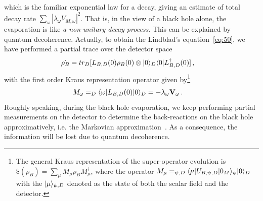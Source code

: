 \documentclass[12pt,a4paper]{article}
\begin{document}
which is the familiar exponential law for a decay, giving an estimate of total decay rate
$\sum_{\omega}|\lambda_{\omega}V_{M,\omega}|^2$. That is,
in the view of a black hole alone, the evaporation is like \emph{a
non-unitary decay process}. This can be explained by quantum decoherence. Actually, to obtain the Lindblad's
equation~\eqref{eq:50}, we have performed a partial trace over the
detector space
\begin{equation}
\label{eq:52}
\begin{split}
\dot{\rho_B} &=
tr_{D}[L_{B,D}(0)\rho_B(0)\otimes\arrowvert0\rangle_D\langle0\arrowvert
L_{B,D}^{\dag}(0)] \,,
\end{split}
\end{equation}
with the first order Kraus representation operator given
by\footnote{The general Kraus representation of the
super-operator evolution is
$\$(\rho_B)=\sum_{\mu}M_{\mu}\rho_BM_{\mu}^{\dag}$, where the
operator $M_{\mu}=_{\psi,D}\langle\mu\arrowvert
U_{B,\psi,D}\arrowvert0_M\rangle_{\psi}\arrowvert0\rangle_D$ with the
$\arrowvert\mu\rangle_{\psi,D}$ denoted as the state of both the scalar field and the
detector.}
\begin{equation}
\label{eq:53}
\begin{split}
M_{\omega} &= _D\langle\omega\arrowvert
L_{B,D}(0)\arrowvert0\rangle_D=-\lambda_{\omega}\mathbf{V}_{\omega}
\,.
\end{split}
\end{equation}
Roughly speaking, during the black hole evaporation, we keep
performing partial measurements on the detector to determine the
back-reactions on the black hole approximatively, i.e. the Markovian approximation~\cite{i}.
As a consequence, the information will be lost due to quantum decoherence.
\end{document}
